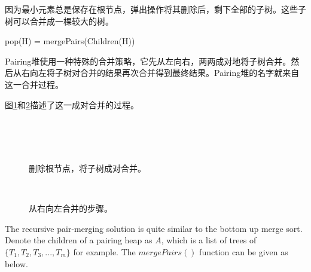 \documentclass[UTF8]{article}
\begin{document}
因为最小元素总是保存在根节点，弹出操作将其删除后，剩下全部的子树。这些子树可以合并成一棵较大的树。

\be
  pop(H) = mergePairs(Children(H))
\ee

Pairing堆使用一种特殊的合并策略，它先从左向右，两两成对地将子树合并。然后从右向左将子树对合并的结果再次合并得到最终结果。Pairing堆的名字就来自这一合并过程。

图\ref{fig:merge-pairs}和\ref{fig:merge-right}描述了这一成对合并的过程。

\begin{figure}[htbp]
  \centering
   \\
   \\
   \\
  \caption{删除根节点，将子树成对合并。} \label{fig:merge-pairs}
\end{figure}

\begin{figure}[htbp]
  \centering
   \\
  \caption{从右向左合并的步骤。} \label{fig:merge-right}
\end{figure}

The recursive pair-merging solution is quite similar to the bottom up
merge sort\cite{okasaki-book}. Denote the children of a pairing
heap as $A$, which is a list of trees of $\{ T_1, T_2, T_3, ..., T_m\}$
for example. The $mergePairs()$ function can be given as below.
\end{document}
